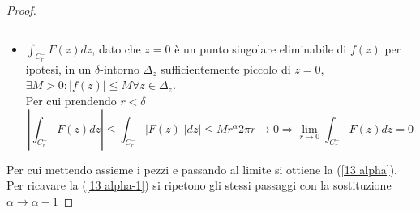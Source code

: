 \documentclass[twoside]{article}
\begin{document}
\begin{proof}
\begin{itemize}
\begin{equation}
    \end{equation}
    \item $\int_{C_r^-}F(z)dz$, dato che $z=0$ è un punto singolare eliminabile di $f(z)$ per ipotesi, in un $\delta$-intorno $\Delta_z$ sufficientemente piccolo di $z=0$, $\exists M>0:|f(z)|\le M \forall z\in \Delta_z$.\\
    Per cui prendendo $r<\delta$
    \begin{equation}
        \left|\int_{C_r^-}F(z)dz\right|\le\int_{C_r^-}|F(z)||dz|\le Mr^\alpha 2\pi r\to 0 \Longrightarrow \lim_{r\to0}\int_{C_r^-}F(z)dz=0
    \end{equation}
\end{itemize}
Per cui mettendo assieme i pezzi e passando al limite si ottiene la (\ref{13 alpha}).\\
Per ricavare la (\ref{13 alpha-1}) si ripetono gli stessi passaggi con la sostituzione $\alpha\to\alpha -1$
\end{proof}
\end{document}
